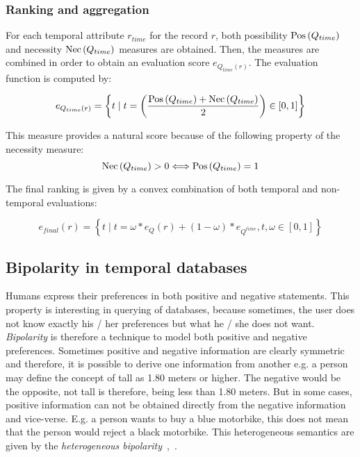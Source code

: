 \subsubsection{Ranking and aggregation}
For each temporal attribute $r_{time}$ for the record $r$, both possibility $\operatorname{Pos} \left( Q_{time}\right)$ and necessity $\operatorname{Nec} \left( Q_{time} \right)$ measures are obtained. Then, the measures are combined in order to obtain an evaluation score $e_{Q_{time} \left( r \right)}$. The evaluation function is computed by:

\begin{equation}
\label{eq:temporal-eval}
e_{Q_{time} \left( r \right)} = \left \lbrace t \mid t = \left( \frac{\Pos \left( Q_{time}\right) + \Nec \left( Q_{time} \right)}{2} \right)   \in \left[ 0,1\right] \right \rbrace
\end{equation}

This measure provides a natural score because of the following property of the necessity measure: 
\begin{equation}
\label{eq:necessity} %
\Nec \left( Q_{time} \right) > 0  \Longleftrightarrow  \Pos \left( Q_{time}\right) = 1
\end{equation}

The final ranking is given by a convex combination of both temporal and non-temporal evaluations:

\begin{equation}
\label{eq:convex-combination}
e_{final} \left( r \right) = \left \lbrace t \mid t = \omega \ast e_{Q} \left( r \right) + \left( 1- \omega \right) \ast e_{Q^{time}}, t,\omega \in \left[0,1\right] \right \rbrace
\end{equation}




\subsection{Bipolarity in temporal databases}
\label{subsubsec:bipolarity}
Humans express their preferences in both positive and negative statements. This property is interesting in querying of databases, because sometimes, the user does not know exactly his / her preferences but what he / she does not want. \emph{Bipolarity} is therefore a technique to model both positive and negative preferences. Sometimes positive and negative information are clearly symmetric and therefore, it is possible to derive one information from another e.g. a person may define the concept of tall as 1.80 meters or higher. The negative would be the opposite, not tall is therefore, being less than 1.80 meters.  But in some cases, positive information can not be obtained directly from the negative information and vice-verse. E.g. a person wants to buy a blue motorbike, this does not mean that the person would reject a black motorbike. This heterogeneous semantics are given by the \emph{heterogeneous bipolarity}~\cite{Dubois2006},~\cite{Dubois2008}.\\

